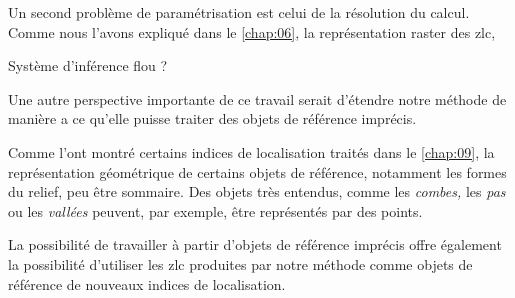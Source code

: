 
Un second problème de paramétrisation est celui de la résolution du
calcul. Comme nous l'avons expliqué dans le \autoref{chap:06}, la
représentation raster des \ac{zlc},


Système d'inférence flou ?












Une autre perspective importante de ce travail serait d'étendre notre
méthode de manière a ce qu'elle puisse traiter des objets de référence
imprécis.

Comme l'ont montré certains indices de localisation traités dans le
\autoref{chap:09}, la représentation géométrique de certains objets de
référence, notamment les formes du relief, peu être sommaire. Des
objets très entendus, comme les \emph{combes,} les \emph{pas} ou les
\emph{vallées} peuvent, par exemple, être représentés par des points.


La possibilité de travailler à partir d'objets de référence imprécis
offre également la possibilité d'utiliser les \ac{zlc} produites par
notre méthode comme objets de référence de nouveaux indices de
localisation.


